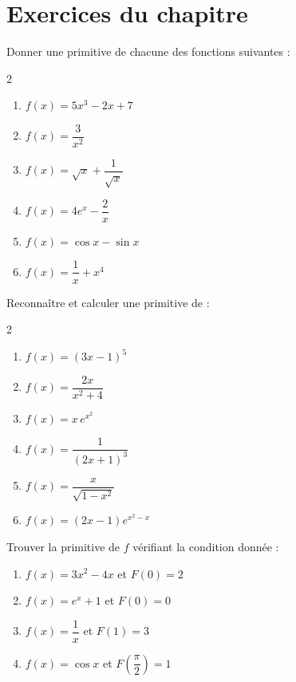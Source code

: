 \newpage
\section*{Exercices du chapitre}

\begin{exercice}
  Donner une primitive de chacune des fonctions suivantes :
  \begin{multicols}{2}
  \begin{enumerate}
    \item $f(x) = 5x^3 - 2x + 7$
    \item $f(x) = \dfrac{3}{x^2}$
    \item $f(x) = \sqrt{x} + \dfrac{1}{\sqrt{x}}$
    \item $f(x) = 4e^x - \dfrac{2}{x}$
    \item $f(x) = \cos x - \sin x$
    \item $f(x) = \dfrac{1}{x} + x^4$
  \end{enumerate}
  \end{multicols}
\end{exercice}

\begin{exercice}
  Reconnaître et calculer une primitive de :
  \begin{multicols}{2}
  \begin{enumerate}
    \item $f(x) = (3x-1)^5$
    \item $f(x) = \dfrac{2x}{x^2+4}$
    \item $f(x) = x\,e^{x^2}$
    \item $f(x) = \dfrac{1}{(2x+1)^3}$
    \item $f(x) = \dfrac{x}{\sqrt{1-x^2}}$
    \item $f(x) = (2x-1)e^{x^2-x}$
  \end{enumerate}
  \end{multicols}
\end{exercice}

\begin{exercice}
  Trouver la primitive de $f$ v\'{e}rifiant la condition donn\'{e}e :
  \begin{enumerate}
    \item $f(x) = 3x^2 - 4x$ et $F(0) = 2$
    \item $f(x) = e^x + 1$ et $F(0) = 0$
    \item $f(x) = \dfrac{1}{x}$ et $F(1) = 3$
    \item $f(x) = \cos x$ et $F\!\left(\dfrac{\pi}{2}\right) = 1$
  \end{enumerate}
\end{exercice}

